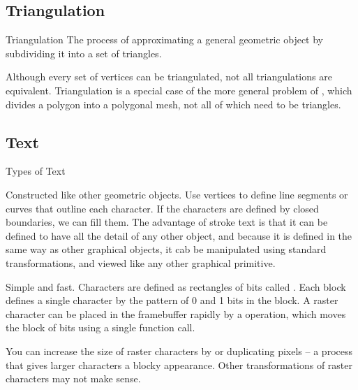 \documentclass[../notes.tex]{subfiles}
\begin{document}
      \subsection{Triangulation}
        \begin{definition}{Triangulation}
          The process of approximating a general geometric object by subdividing it into
          a set of triangles.
        \end{definition}

        Although every set of vertices can be triangulated, not all triangulations are equivalent.
        Triangulation is a special case of the more general problem of
        , which divides a polygon into a polygonal mesh,
        not all of which need to be triangles.

      \subsection{Text}
        \begin{sidenote}{Types of Text}
          $ $\vspace{-1em}
          \begin{descriptimize}
            \item[Stroke Text] Constructed like other geometric objects.
              Use vertices to define line segments or curves that outline each character.
              If the characters are defined by closed boundaries, we can fill them.
              The advantage of stroke text is that it can be defined to have all the detail
              of any other object, and because it is defined in the same way as other graphical
              objects, it cab be manipulated using standard transformations,
              and viewed like any other graphical primitive.
            \item[Raster Text] Simple and fast.
              Characters are defined as rectangles of bits called .
              Each block defines a single character by the pattern of 0 and 1 bits
              in the block.
              A raster character can be placed in the framebuffer rapidly
              by a  operation,
              which moves the block of bits using a single function call.

              You can increase the size of raster characters by 
              or duplicating pixels -- a process that gives larger characters a blocky
              appearance.
              Other transformations of raster characters may not make sense.
          \end{descriptimize}
        \end{sidenote}
\end{document}
